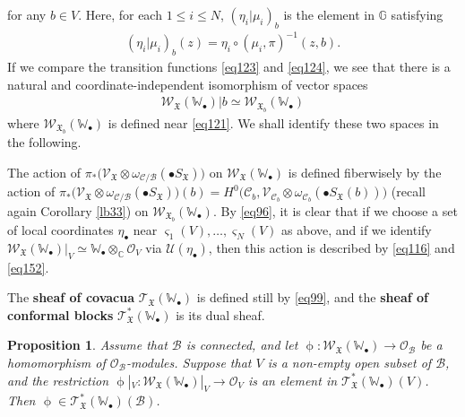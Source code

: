 \documentclass[12pt,b5paper,notitlepage]{report}
\theoremstyle{definition}
\theoremstyle{plain}
\newtheorem{pp}[df]{Proposition}
\newcommand{\fk}{\mathfrak}
\newcommand{\mc}{\mathcal}
\newcommand{\scr}{\mathscr}
\newcommand{\sgm}{\varsigma}
\newcommand{\blt}{\bullet}
\newcommand{\Wbb}{\mathbb W}
\newcommand{\Gbb}{\mathbb G}
\newcommand{\Cbb}{\mathbb C}
\numberwithin{equation}{section}
\begin{document}
for any $b\in V$. Here, for each $1\leq i\leq N$, $(\eta_i|\mu_i)_b$ is the element in $\Gbb$ satisfying
\begin{align}
(\eta_i|\mu_i)_b(z)=\eta_i\circ(\mu_i,\pi)^{-1}(z,b).\label{eq244}
\end{align}
If we compare the transition functions \eqref{eq123} and \eqref{eq124}, we see that there is a natural and coordinate-independent isomorphism of vector spaces
\begin{align*}
\scr W_{\fk X}(\Wbb_\blt)|b\simeq \scr W_{\fk X_b}(\Wbb_\blt)
\end{align*}
where $\scr W_{\fk X_b}(\Wbb_\blt)$ is defined near \eqref{eq121}. We shall identify these two spaces in the following.

The action of $\pi_*\big(\scr V_{\fk X}\otimes\omega_{\mc C/\mc B}(\blt S_{\fk X})\big)$ on $\scr W_{\fk X}(\Wbb_\blt)$ is defined fiberwisely by the action of $\pi_*\big(\scr V_{\fk X}\otimes\omega_{\mc C/\mc B}(\blt S_{\fk X})\big)(b)=H^0\big(\mc C_b,\scr V_{\mc C_b}\otimes\omega_{\mc C_b}(\blt S_{\fk X}(b))\big)$ (recall again Corollary \ref{lb33}) on $\scr W_{\fk X_b}(\Wbb_\blt)$. By \eqref{eq96}, it is clear that if we choose a set of local coordinates $\eta_\blt$ near $\sgm_1(V),\dots,\sgm_N(V)$ as above, and if we  identify $\scr W_{\fk X}(\Wbb_\blt)|_V\simeq\Wbb_\blt\otimes_\Cbb\scr O_V$ via $\mc U(\eta_\blt)$, then this action is described by \eqref{eq116} and \eqref{eq152}.

The \textbf{sheaf of covacua} $\scr T_{\fk X}(\Wbb_\blt)$ is defined still by \eqref{eq99}, and the \textbf{sheaf of conformal blocks} $\scr T_{\fk X}^*(\Wbb_\blt)$ is its dual sheaf.

\begin{pp}\label{lb41}
Assume that $\mc B$ is connected, and let $\upphi:\scr W_{\fk X}(\Wbb_\blt)\rightarrow \scr O_{\mc B}$ be a homomorphism of $\scr O_{\mc B}$-modules. Suppose that $V$ is a non-empty open subset of $\mc B$, and the restriction $\upphi|_V:\scr W_{\fk X}(\Wbb_\blt)|_V\rightarrow \scr O_V$ is  an element in $\scr T_{\fk X}^*(\Wbb_\blt)(V)$. Then $\upphi\in\scr T_{\fk X}^*(\Wbb_\blt)(\mc B)$.
\end{pp}
\end{document}
